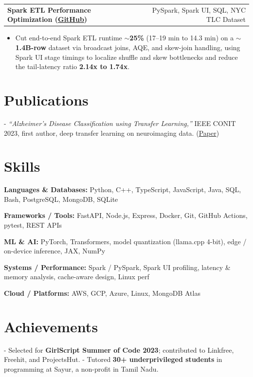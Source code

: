 \documentclass[letterpaper,11pt]{article}
\makeatletter
\newcommand{\projItem}[2]{%
  \vspace{6pt}
  \begin{tabular*}{\textwidth}{@{}l@{\extracolsep{\fill}}r@{}}
    \textbf{#1} & #2 \\
  \end{tabular*}\par\vspace{-2pt}
}
\newcommand{\skillLine}[2]{\textbf{#1:} #2\par\vspace{2pt}}
\newcommand{\inlineBlock}[1]{{\setlength{\leftskip}{0.18in}\small #1\par}}
\makeatother
\begin{document}
\projItem{Spark ETL Performance Optimization {\normalfont\small(\href{https://github.com/Deva-1903/Spark-ETL-Optimization}{GitHub})}}{PySpark, Spark UI, SQL, NYC TLC Dataset}
\begin{itemize}
  \item Cut end-to-end Spark ETL runtime \textbf{$\sim$25\%} (17--19 min to 14.3 min) on a \textbf{$\sim$1.4B-row} dataset via broadcast joins, AQE, and skew-join handling, using Spark UI stage timings to localize shuffle and skew bottlenecks and reduce the tail-latency ratio \textbf{2.14x to 1.74x}.
\end{itemize}

\section{Publications}
\inlineBlock{- \textit{``Alzheimer's Disease Classification using Transfer Learning,''} IEEE CONIT 2023, first author, deep transfer learning on neuroimaging data. {\normalfont\small(\href{https://ieeexplore.ieee.org/document/10205760}{Paper})}}

\section{Skills}
\skillLine{Languages \& Databases}{Python, C++, TypeScript, JavaScript, Java, SQL, Bash, PostgreSQL, MongoDB, SQLite}
\skillLine{Frameworks / Tools}{FastAPI, Node.js, Express, Docker, Git, GitHub Actions, pytest, REST APIs}
\skillLine{ML \& AI}{PyTorch, Transformers, model quantization (llama.cpp 4-bit), edge / on-device inference, JAX, NumPy}
\skillLine{Systems / Performance}{Spark / PySpark, Spark UI profiling, latency \& memory analysis, cache-aware design, Linux perf}
\skillLine{Cloud / Platforms}{AWS, GCP, Azure, Linux, MongoDB Atlas}

\section{Achievements}
\inlineBlock{- Selected for \textbf{GirlScript Summer of Code 2023}; contributed to Linkfree, Freehit, and ProjectsHut. - Tutored \textbf{30+ underprivileged students} in programming at Sayur, a non-profit in Tamil Nadu.}
\end{document}
